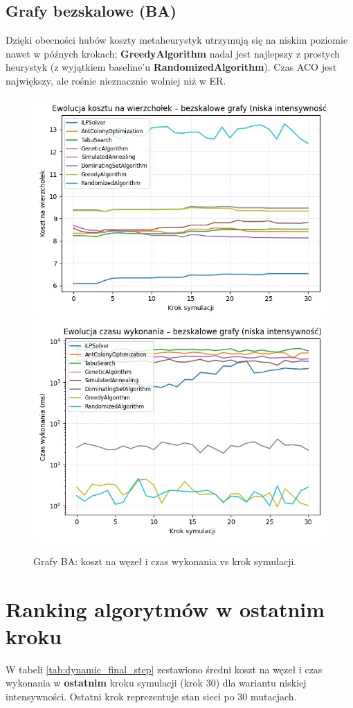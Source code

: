 \subsection{Grafy bezskalowe (BA)}

Dzięki obecności hubów koszty metaheurystyk utrzymują się na niskim poziomie nawet w późnych krokach; \textbf{GreedyAlgorithm} nadal jest najlepszy z prostych heurystyk (z wyjątkiem baseline'u \textbf{RandomizedAlgorithm}). Czas ACO jest największy, ale rośnie nieznacznie wolniej niż w ER.

\begin{figure}[H]
  \centering
  \includegraphics[width=0.48\linewidth]{assets/figures/ba_cost_vs_step.png}
  \includegraphics[width=0.48\linewidth]{assets/figures/ba_time_vs_step.png}
  \caption{Grafy BA: koszt na węzeł i czas wykonania vs krok symulacji.}
  \label{fig:ba_time_step}
\end{figure}

\section{Ranking algorytmów w ostatnim kroku}

W tabeli \ref{tab:dynamic_final_step} zestawiono średni koszt na węzeł i czas wykonania w \textbf{ostatnim} kroku symulacji (krok 30) dla wariantu niskiej intensywności. Ostatni krok reprezentuje stan sieci po 30 mutacjach.

